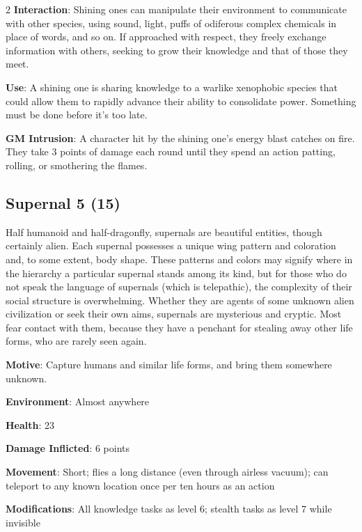 \begin{multicols}{2}
\textbf{Interaction}: Shining ones can manipulate their environment to communicate with other species, using sound, light, puffs of odiferous complex chemicals in place of words, and so on. If approached with respect, they freely exchange information with others, seeking to grow their knowledge and that of those they meet. 

\textbf{Use}: A shining one is sharing knowledge to a warlike xenophobic species that could allow them to rapidly advance their ability to consolidate power. Something must be done before it’s too late.

\textbf{GM Intrusion}: A character hit by the shining one’s energy blast catches on fire. They take 3 points of damage each round until they spend an action patting, rolling, or smothering the flames.

\subsection{Supernal 5 (15)}

Half humanoid and half-dragonfly, supernals are beautiful entities, though certainly alien. Each supernal possesses a unique wing pattern and coloration and, to some extent, body shape. These patterns and colors may signify where in the hierarchy a particular supernal stands among its kind, but for those who do not speak the language of supernals (which is telepathic), the complexity of their social structure is overwhelming. Whether they are agents of some unknown alien civilization or seek their own aims, supernals are mysterious and cryptic. Most fear contact with them, because they have a penchant for stealing away other life forms, who are rarely seen again. 

\textbf{Motive}: Capture humans and similar life forms, and bring them somewhere unknown. 

\textbf{Environment}: Almost anywhere 

\textbf{Health}: 23 

\textbf{Damage Inflicted}: 6 points 

\textbf{Movement}: Short; flies a long distance (even through airless vacuum); can teleport to any known location once per ten hours as an action 

\textbf{Modifications}: All knowledge tasks as level 6; stealth tasks as level 7 while invisible 


\end{multicols}

